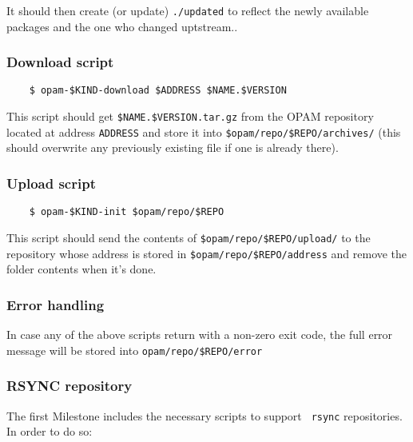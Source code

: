 \documentclass[a4paper,11pt]{article}
\begin{document}
It should then create (or update) \verb+./updated+ to reflect the
newly available packages and the one who changed uptstream..

\subsubsection{Download script}
\label{script-download}

\begin{verbatim}
    $ opam-$KIND-download $ADDRESS $NAME.$VERSION
\end{verbatim}

This script should get \verb+$NAME.$VERSION.tar.gz+ from the OPAM
repository located at address \verb+ADDRESS+ and store it into
\verb+$opam/repo/$REPO/archives/+ (this should overwrite any
previously existing file if one is already there).

\subsubsection{Upload script}
\label{script-upload}

\begin{verbatim}
    $ opam-$KIND-init $opam/repo/$REPO
\end{verbatim}

This script should send the contents of
\verb+$opam/repo/$REPO/upload/+ to the repository whose address is
stored in \verb+$opam/repo/$REPO/address+ and remove the folder
contents when it's done.

\subsubsection{Error handling}
\label{script-error}

In case any of the above scripts return with a non-zero exit code, the
full error message will be stored into \verb+opam/repo/$REPO/error+

\subsubsection{RSYNC repository}

The first Milestone includes the necessary scripts to support {\tt
  rsync} repositories. In order to do so:
\end{document}
